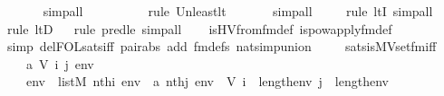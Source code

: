 \begin{isabellebody}
\ \ \ \ \isamarkupfalse%
\ simp{\isacharunderscore}{\kern0pt}all\ \ \ \ \ \ \ \isanewline
\ \ \isamarkupfalse%
{\isacharparenleft}{\kern0pt}rule\ Un{\isacharunderscore}{\kern0pt}least{\isacharunderscore}{\kern0pt}lt{\isacharparenright}{\kern0pt}{\isacharplus}{\kern0pt}\isanewline
\ \ \ \ \ \isamarkupfalse%
\ simp{\isacharunderscore}{\kern0pt}all\isanewline
\ \ \ \ \isamarkupfalse%
{\isacharparenleft}{\kern0pt}rule\ ltI{\isacharcomma}{\kern0pt}\ simp{\isacharunderscore}{\kern0pt}all{\isacharparenright}{\kern0pt}{\isacharplus}{\kern0pt}\isanewline
\ \ \isamarkupfalse%
{\isacharparenleft}{\kern0pt}rule\ ltD{\isacharparenright}{\kern0pt}\isanewline
\ \ \isamarkupfalse%
{\isacharparenleft}{\kern0pt}rule\ pred{\isacharunderscore}{\kern0pt}le{\isacharcomma}{\kern0pt}\ simp{\isacharunderscore}{\kern0pt}all{\isacharparenright}{\kern0pt}{\isacharplus}{\kern0pt}\isanewline
\ \ \isamarkupfalse%
\ is{\isacharunderscore}{\kern0pt}HVfrom{\isacharunderscore}{\kern0pt}fm{\isacharunderscore}{\kern0pt}def\ is{\isacharunderscore}{\kern0pt}powapply{\isacharunderscore}{\kern0pt}fm{\isacharunderscore}{\kern0pt}def\isanewline
\ \ \isamarkupfalse%
{\isacharparenleft}{\kern0pt}simp\ del{\isacharcolon}{\kern0pt}FOL{\isacharunderscore}{\kern0pt}sats{\isacharunderscore}{\kern0pt}iff\ pair{\isacharunderscore}{\kern0pt}abs\ add{\isacharcolon}{\kern0pt}\ fm{\isacharunderscore}{\kern0pt}defs\ nat{\isacharunderscore}{\kern0pt}simp{\isacharunderscore}{\kern0pt}union{\isacharparenright}{\kern0pt}\ \isanewline
\ \ \isamarkupfalse%
%
\endisatagproof
{\isafoldproof}%
%
\isadelimproof
\isanewline
%
\endisadelimproof
\isanewline
{}\isamarkupfalse%
\ sats{\isacharunderscore}{\kern0pt}is{\isacharunderscore}{\kern0pt}MVset{\isacharunderscore}{\kern0pt}fm{\isacharunderscore}{\kern0pt}iff\ {\isacharcolon}{\kern0pt}\ \isanewline
\ \ \ a\ V\ i\ j\ env\ \ \isanewline
\ \ \ {\isachardoublequoteopen}env\ {\isasymin}\ list{\isacharparenleft}{\kern0pt}M{\isacharparenright}{\kern0pt}{\isachardoublequoteclose}\ {\isachardoublequoteopen}nth{\isacharparenleft}{\kern0pt}i{\isacharcomma}{\kern0pt}\ env{\isacharparenright}{\kern0pt}\ {\isacharequal}{\kern0pt}\ a{\isachardoublequoteclose}\ {\isachardoublequoteopen}nth{\isacharparenleft}{\kern0pt}j{\isacharcomma}{\kern0pt}\ env{\isacharparenright}{\kern0pt}\ {\isacharequal}{\kern0pt}\ V{\isachardoublequoteclose}\ {\isachardoublequoteopen}i\ {\isacharless}{\kern0pt}\ length{\isacharparenleft}{\kern0pt}env{\isacharparenright}{\kern0pt}{\isachardoublequoteclose}\ {\isachardoublequoteopen}j\ {\isacharless}{\kern0pt}\ length{\isacharparenleft}{\kern0pt}env{\isacharparenright}{\kern0pt}{\isachardoublequoteclose}\isanewline

\end{isabellebody}
